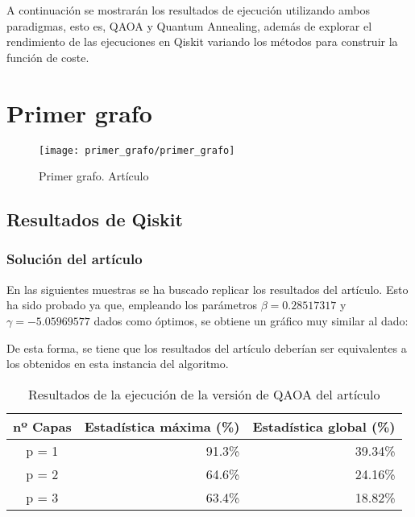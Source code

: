 \documentclass{article}
\begin{document}
A continuación se mostrarán los resultados de ejecución utilizando ambos paradigmas, esto es, QAOA y Quantum Annealing, además de explorar el rendimiento de las ejecuciones en Qiskit variando los métodos para construir la función de coste.

\section{Primer grafo}

\begin{figure}[htbp]
  \centering
  \texttt{[image: primer\_grafo/primer\_grafo]}
  \caption{Primer grafo. Artículo \cite{multi-objective_routing_optimization}}
\end{figure}

\subsection{Resultados de Qiskit}

\subsubsection{Solución del artículo}
\label{sec:5-primer-paper-resultados_qiskit}
En las siguientes muestras se ha buscado replicar los resultados del artículo. Esto ha sido probado ya que, empleando los parámetros \(\beta = 0.28517317\) y \(\gamma = -5.05969577 \) dados como óptimos, se obtiene un gráfico muy similar al dado: \\

\begin{figure}[htbp]
  \centering
  \caption{} \label{fig:5-primer_grafo/sin_restriccion_extra/primer_paper_aer_resultado}
\end{figure}

De esta forma, se tiene que los resultados del artículo deberían ser equivalentes a los obtenidos en esta instancia del algoritmo.

\begin{table}[htbp]
  \centering
  \begin{tabular}{|c|r|r|}
    \hline
    \textbf{nº Capas} & \textbf{Estadística máxima (\%)} & \textbf{Estadística global (\%)} \\ \hline
    p = 1 & 91.3\% & 39.34\% \\ \hline
    p = 2 & 64.6\% & 24.16\% \\ \hline
    p = 3 & 63.4\% & 18.82\% \\ \hline
  \end{tabular}
  \caption{Resultados de la ejecución de la versión de QAOA del artículo}
  \label{tab:5-primer-paper-aer_estadisticas}
\end{table}
\end{document}
